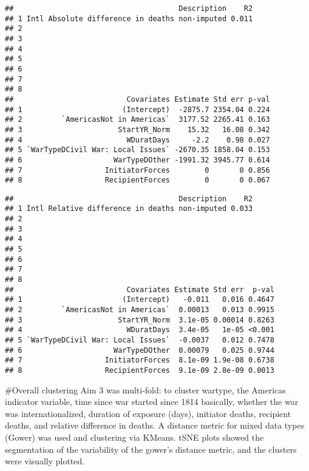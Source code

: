 \documentclass[
]{article}
\begin{document}
\begin{verbatim}
##                                      Description    R2
## 1 Intl Absolute difference in deaths non-imputed 0.011
## 2                                                     
## 3                                                     
## 4                                                     
## 5                                                     
## 6                                                     
## 7                                                     
## 8                                                     
##                          Covariates Estimate Std err p-val
## 1                       (Intercept)  -2875.7 2354.04 0.224
## 2         `AmericasNot in Americas`  3177.52 2265.41 0.163
## 3                      StartYR_Norm    15.32   16.08 0.342
## 4                        WDuratDays     -2.2    0.98 0.027
## 5 `WarTypeDCivil War: Local Issues` -2670.35 1858.04 0.153
## 6                     WarTypeDOther -1991.32 3945.77 0.614
## 7                   InitiatorForces        0       0 0.856
## 8                   RecipientForces        0       0 0.067
\end{verbatim}

\begin{verbatim}
##                                      Description    R2
## 1 Intl Relative difference in deaths non-imputed 0.033
## 2                                                     
## 3                                                     
## 4                                                     
## 5                                                     
## 6                                                     
## 7                                                     
## 8                                                     
##                          Covariates Estimate Std err  p-val
## 1                       (Intercept)   -0.011   0.016 0.4647
## 2         `AmericasNot in Americas`  0.00013   0.013 0.9915
## 3                      StartYR_Norm  3.1e-05 0.00014 0.8263
## 4                        WDuratDays  3.4e-05   1e-05 <0.001
## 5 `WarTypeDCivil War: Local Issues`  -0.0037   0.012 0.7478
## 6                     WarTypeDOther  0.00079   0.025 0.9744
## 7                   InitiatorForces  8.1e-09 1.9e-08 0.6738
## 8                   RecipientForces  9.1e-09 2.8e-09 0.0013
\end{verbatim}

\#Overall clustering Aim 3 was multi-fold: to cluster wartype, the
Americas indicator variable, time since war started since 1814
basically, whether the war was internationalized, duration of exposure
(days), initiator deaths, recipient deaths, and relative difference in
deaths. A distance metric for mixed data types (Gower) was used and
clustering via KMeans. tSNE plots showed the segmentation of the
variability of the gower's distance metric, and the clusters were
visually plotted.
\end{document}

